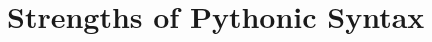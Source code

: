 \documentclass{l4proj}
\begin{document}
\section{Strengths of Pythonic Syntax}









\end{document}

